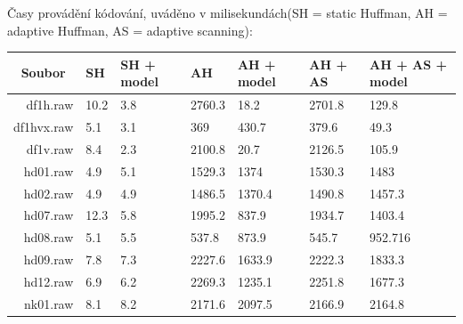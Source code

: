 \documentclass[12pt,a4paper,titlepage,final]{report}
\begin{document}
Časy provádění kódování, uváděno v milisekundách(SH = static Huffman, AH = adaptive Huffman, AS = adaptive scanning):
\begin{table}[H]
\begin{tabular}{|r|l|l|l|l|l|l|}
\hline
\multicolumn{1}{|c|}{Soubor} & SH   & SH + model & AH     & AH + model & AH + AS & AH + AS + model \\ \hline
df1h.raw                     & 10.2 & 3.8        & 2760.3 & 18.2       & 2701.8  & 129.8           \\ \hline
df1hvx.raw                   & 5.1  & 3.1        & 369    & 430.7      & 379.6   & 49.3            \\ \hline
df1v.raw                     & 8.4  & 2.3        & 2100.8 & 20.7       & 2126.5  & 105.9           \\ \hline
hd01.raw                     & 4.9  & 5.1        & 1529.3 & 1374       & 1530.3  & 1483            \\ \hline
hd02.raw                     & 4.9  & 4.9        & 1486.5 & 1370.4     & 1490.8  & 1457.3          \\ \hline
hd07.raw                     & 12.3 & 5.8        & 1995.2 & 837.9      & 1934.7  & 1403.4          \\ \hline
hd08.raw                     & 5.1  & 5.5        & 537.8  & 873.9      & 545.7   & 952.716         \\ \hline
hd09.raw                     & 7.8  & 7.3        & 2227.6 & 1633.9     & 2222.3  & 1833.3          \\ \hline
hd12.raw                     & 6.9  & 6.2        & 2269.3 & 1235.1     & 2251.8  & 1677.3          \\ \hline
nk01.raw                     & 8.1  & 8.2        & 2171.6 & 2097.5     & 2166.9  & 2164.8          \\ \hline
\end{tabular}
\end{table}
\end{document}
